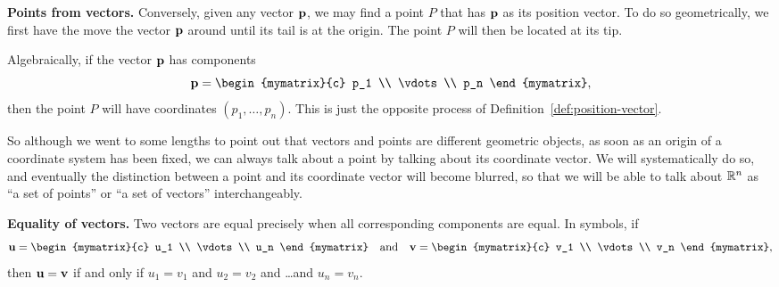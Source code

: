 \noindent\textbf{Points from vectors.} Conversely, given any vector
$\vect{p}$, we may find a point $P$ that has $\vect{p}$ as its
position vector. To do so geometrically, we first have the move the
vector $\vect{p}$ around until its tail is at the origin. The point
$P$ will then be located at its tip.
\begin{center}
\end{center}
Algebraically, if the vector $\vect{p}$ has components
\begin{equation*}
  \vect{p} =
  \begin{mymatrix}{c}
    p_1    \\
    \vdots \\
    p_n
  \end{mymatrix},
\end{equation*}
then the point $P$ will have coordinates $(p_1,\ldots,p_n)$. This is
just the opposite process of Definition~\ref{def:position-vector}.

So although we went to some lengths to point out that vectors and
points are different geometric objects, as soon as an origin of a
coordinate system has been fixed, we can always talk about a point by
talking about its coordinate vector. We will systematically do so, and
eventually the distinction between a point and its coordinate vector
will become blurred, so that we will be able to talk about $\mathbb{R}^n$ as
``a set of points'' or ``a set of vectors'' interchangeably.  \bigskip

\noindent\textbf{Equality of vectors.}
Two vectors are equal%
%
 precisely when all corresponding components
are equal. In symbols, if
\begin{equation*}
  \vect{u} =
  \begin{mymatrix}{c}
    u_1 \\
    \vdots \\
    u_n
  \end{mymatrix}
  \quad\mbox{and}\quad
  \vect{v} =
  \begin{mymatrix}{c}
    v_1 \\
    \vdots \\
    v_n
  \end{mymatrix},
\end{equation*}
then $\vect{u}=\vect{v}$ if and only if $u_1=v_1$ and $u_2=v_2$ and
\ldots and $u_n=v_n$.
\bigskip

